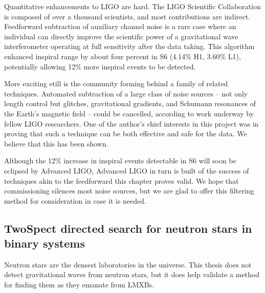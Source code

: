 Quantitative enhancements to LIGO are hard.
The LIGO Scientific Collaboration is composed of over a thousand scientists, and most contributions are indirect.
Feedforward subtraction of auxiliary channel noise is a rare case where an individual can directly improve the scientific power of a gravitational wave interferometer operating at full sensitivity after the data taking.
This algorithm enhanced inspiral range by about four percent in S6 (4.14\% H1, 3.60\% L1), potentially allowing 12\% more inspiral events to be detected.

More exciting still is the community forming behind a family of related techniques.
Automated subtraction of a large class of noise sources -- not only length control but glitches, gravitational gradients, and Schumann resonances of the Earth's magnetic field -- could be cancelled, according to work underway by fellow LIGO researchers.
One of the author's chief interests in this project was in proving that such a technique can be both effective and safe for the data.
We believe that this has been shown.

Although the 12\% increase in inspiral events detectable in S6 will soon be eclipsed by Advanced LIGO, Advanced LIGO in turn is built of the success of techniques akin to the feedforward this chapter proves valid.
We hope that commissioning silences most noise sources, but we are glad to offer this filtering method for consideration in case it is needed.

        \subsection{TwoSpect directed search for neutron stars in binary systems}
        \label{TwoSpect_end}




Neutron stars are the densest laboratories in the universe.
This thesis does not detect gravitational waves from neutron stars, but it does help validate a method for finding them as they emanate from LMXBs.

